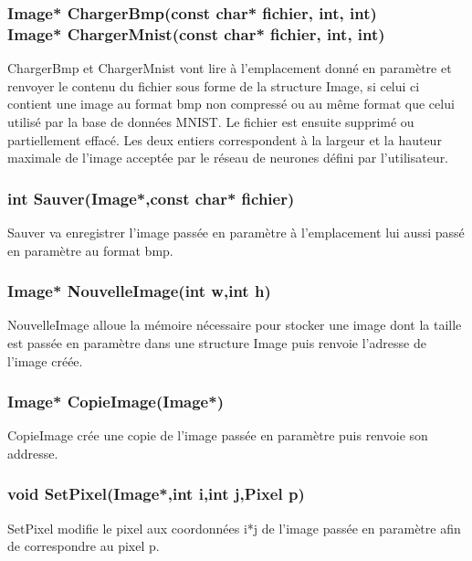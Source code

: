 \documentclass{article}
\begin{document}
		\subsubsection{\textcolor{myblue}{\textbf{Image*}} ChargerBmp(\textcolor{myblue}{\textbf{const char*}} fichier,  \textcolor{myblue}{\textbf{int}},  \textcolor{myblue}{\textbf{int}})\\
		\textcolor{myblue}{\textbf{Image*}} ChargerMnist(\textcolor{myblue}{\textbf{const char*}} fichier,  \textcolor{myblue}{\textbf{int}},  \textcolor{myblue}{\textbf{int}})}
		ChargerBmp et ChargerMnist vont lire à l'emplacement donné en paramètre et renvoyer le contenu du fichier sous forme de la structure Image, si celui ci contient une image au format bmp non compressé ou au même format que celui utilisé par la base de données MNIST.
		Le fichier est ensuite supprimé ou partiellement effacé.
		Les deux entiers correspondent à la largeur et la hauteur maximale de l'image acceptée par le réseau de neurones défini par l'utilisateur.
		
		\subsubsection{\textcolor{myblue}{\textbf{int}} Sauver(\textcolor{myblue}{\textbf{Image*}},\textcolor{myblue}{\textbf{const char*}} fichier)}
		Sauver va enregistrer l'image passée en paramètre à l'emplacement lui aussi passé en paramètre au format bmp.
		
		\subsubsection{\textcolor{myblue}{\textbf{Image*}} NouvelleImage(\textcolor{myblue}{\textbf{int}} w,\textcolor{myblue}{\textbf{int}} h)}
		NouvelleImage alloue la mémoire nécessaire pour stocker une image dont la taille est passée en paramètre dans une structure Image puis renvoie l'adresse de l'image créée.
		
		\subsubsection{\textcolor{myblue}{\textbf{Image*}} CopieImage(\textcolor{myblue}{\textbf{Image*}})}
		CopieImage crée une copie de l'image passée en paramètre puis renvoie son addresse.
		
		\subsubsection{\textcolor{myblue}{\textbf{void}} SetPixel(\textcolor{myblue}{\textbf{Image*}},\textcolor{myblue}{\textbf{int}} i,\textcolor{myblue}{\textbf{int}} j,\textcolor{myblue}{\textbf{Pixel}} p)}
		SetPixel modifie le pixel aux coordonnées i*j de l'image passée en paramètre afin de correspondre au pixel p.
		
\end{document}

